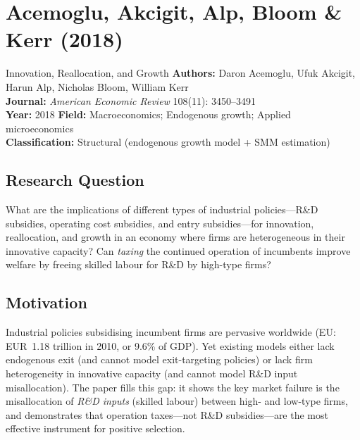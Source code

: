 \chapter{Acemoglu, Akcigit, Alp, Bloom \& Kerr (2018)}

\begin{paperbox}{Innovation, Reallocation, and Growth}
\textbf{Authors:} Daron Acemoglu, Ufuk Akcigit, Harun Alp,
Nicholas Bloom, William Kerr\\[3pt]
\textbf{Journal:} \textit{American Economic Review} 108(11): 3450--3491\\[3pt]
\textbf{Year:} 2018 \quad\textbf{Field:} Macroeconomics; Endogenous growth;
Applied microeconomics\\[3pt]
\textbf{Classification:} Structural (endogenous growth model + SMM estimation)
\end{paperbox}

\section{Research Question}

What are the implications of different types of industrial policies---R\&D
subsidies, operating cost subsidies, and entry subsidies---for innovation,
reallocation, and growth in an economy where firms are heterogeneous in their
innovative capacity? Can \emph{taxing} the continued operation of incumbents
improve welfare by freeing skilled labour for R\&D by high-type firms?

\section{Motivation}

Industrial policies subsidising incumbent firms are pervasive worldwide
(EU: EUR~1.18 trillion in 2010, or 9.6\% of GDP). Yet existing models
either lack endogenous exit (and cannot model exit-targeting policies) or
lack firm heterogeneity in innovative capacity (and cannot model R\&D input
misallocation). The paper fills this gap: it shows the key market failure is
the misallocation of \emph{R\&D inputs} (skilled labour) between high- and
low-type firms, and demonstrates that operation taxes---not R\&D
subsidies---are the most effective instrument for positive selection.

